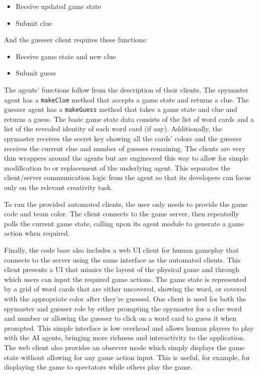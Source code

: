 \documentclass[phd,electronic,oneside,twosidetoc,letterpaper,chaptercenter,parttop,lof]{byumsphd}
\begin{document}
\begin{itemize}
    \setlength{\itemindent}{2em}
    \item Receive updated game state
    \item Submit clue
\end{itemize}

And the guesser client requires these functions:

\begin{itemize}
    \setlength{\itemindent}{2em}
    \item Receive game state and new clue
    \item Submit guess
\end{itemize}

The agents' functions follow from the description of their clients. 
The spymaster agent has a \texttt{makeClue} method that accepts a game state and returns a clue. 
The guesser agent has a \texttt{makeGuess} method that takes a game state and clue and returns a guess.  The basic game state data consists of the list of word cards and a list of the revealed identity of each word card (if any). Additionally, the spymaster receives the secret key showing all the cards' colors and the guesser receives the current clue and number of guesses remaining. The clients are very thin wrappers around the agents but are engineered this way to allow for simple modification to or replacement of the underlying agent. This separates the client/server communication logic from the agent so that its developers can focus only on the relevant creativity task.

To run the provided automated clients, the user only needs to provide the game code and team color. The client connects to the game server, then repeatedly polls the current game state, calling upon its agent module to generate a game action when required.

Finally, the code base also includes a web UI client for human gameplay that connects to the server using the same interface as the automated clients. This client presents a UI that mimics the layout of the physical game and through which users can input the required game actions. The game state is represented by a grid of word cards that are either uncovered, showing the word, or covered with the appropriate color after they're guessed. One client is used for both the spymaster and guesser role by either prompting the spymaster for a clue word and number or allowing the guesser to click on a word card to guess it when prompted. This simple interface is low overhead and allows human players to play with the AI agents, bringing more richness and interactivity to the application. The web client also provides an observer mode which simply displays the game state without allowing for any game action input. This is useful, for example, for displaying the game to spectators while others play the game.
\end{document}
